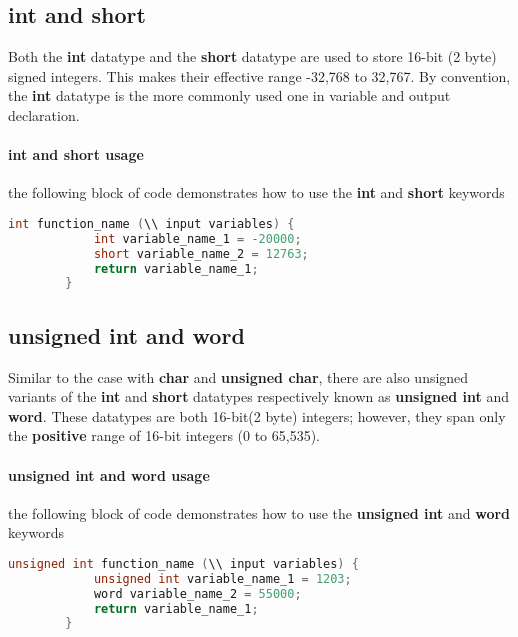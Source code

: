     \subsection{int and short}
    Both the \textbf{int} datatype and the \textbf{short} datatype are used to store 16-bit (2 byte) signed integers. This makes their effective range -32,768 to 32,767. By convention, the \textbf{int} datatype
    is the more commonly used one in variable and output declaration.
    \paragraph*{int and short usage} the following block of code demonstrates how to use the \textbf{int} and \textbf{short} keywords
    \begin{lstlisting}[linewidth=1.5\textwidth, language=C++]
        int function_name (\\ input variables) {
            int variable_name_1 = -20000;
            short variable_name_2 = 12763;
            return variable_name_1;
        }\end{lstlisting}
    
    \subsection{unsigned int and word}
    Similar to the case with \textbf{char} and \textbf{unsigned char}, there are also unsigned variants of the \textbf{int} and \textbf{short} datatypes respectively known as \textbf{unsigned int} and
    \textbf{word}. These datatypes are both 16-bit(2 byte) integers; however, they span only the \textbf{positive} range of 16-bit integers (0 to 65,535).
    \paragraph*{unsigned int and word usage} the following block of code demonstrates how to use the \textbf{unsigned int} and \textbf{word} keywords
    \begin{lstlisting}[linewidth=1.5\textwidth, language=C++]
        unsigned int function_name (\\ input variables) {
            unsigned int variable_name_1 = 1203;
            word variable_name_2 = 55000;
            return variable_name_1;
        }\end{lstlisting}
    
